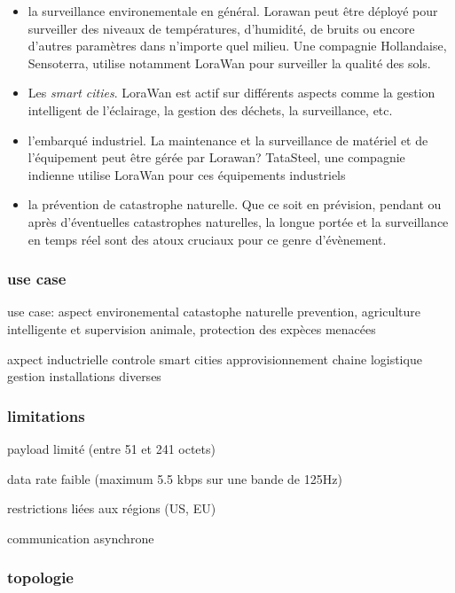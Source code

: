 \begin{itemize}

\item la surveillance environementale en général. Lorawan peut être déployé pour surveiller des niveaux de températures, d'humidité, de bruits ou encore d'autres paramètres dans n'importe quel milieu. Une compagnie Hollandaise, Sensoterra, utilise notamment LoraWan pour surveiller la qualité des sols.
\item Les \textit{smart cities}. LoraWan est actif sur différents aspects comme la gestion intelligent de l'éclairage, la gestion des déchets, la surveillance, etc.
\item l'embarqué industriel. La maintenance et la surveillance de matériel et de l'équipement peut être gérée par Lorawan? TataSteel, une compagnie indienne utilise LoraWan pour ces équipements industriels

\item la prévention de catastrophe naturelle. Que ce soit en prévision, pendant ou après d'éventuelles catastrophes naturelles, la longue portée et la surveillance en temps réel sont des atoux cruciaux pour ce genre d'évènement.
\end{itemize}


\subsubsection{use case}

use case:
aspect environemental 
catastophe naturelle prevention,
agriculture intelligente et supervision animale,
protection des expèces menacées

axpect inductrielle
controle smart cities
approvisionnement chaine logistique
gestion installations diverses

\subsubsection{limitations}

payload limité (entre 51 et 241 octets)

data rate faible (maximum 5.5 kbps sur une bande de 125Hz)

restrictions liées aux régions (US, EU)

communication asynchrone 


\subsubsection{topologie}

